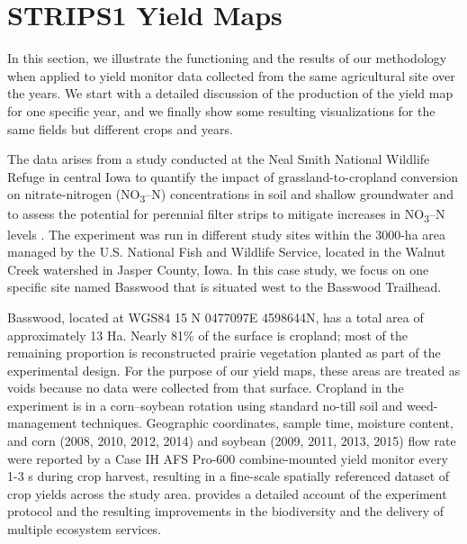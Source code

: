 \section{STRIPS1 Yield Maps}

 In this section, we illustrate the
functioning and the results of our methodology when applied to yield
monitor data collected from the same agricultural site over the
years. We start with a detailed discussion of the production of the
yield map for one specific year, and we finally show some resulting
visualizations for the same fields but different crops and years.

 The data arises from a study
conducted at the Neal Smith National Wildlife Refuge in central Iowa
to quantify the impact of grassland-to-cropland conversion on
nitrate-nitrogen (NO\textsubscript{3}–N) concentrations in soil and
shallow groundwater and to assess the potential for perennial filter
strips to mitigate increases in NO\textsubscript{3}–N levels
\citep{Zhou2010}. The experiment was run in different study sites
within the 3000-ha area managed by the U.S. National Fish and Wildlife
Service, located in the Walnut Creek watershed in Jasper County,
Iowa. In this case study, we focus on one specific site named Basswood
that is situated west to the Basswood Trailhead.

 Basswood, located at WGS84 15 N
0477097E 4598644N, has a total area of approximately 13 Ha. Nearly
81\% of the surface is cropland; most of the remaining proportion is
reconstructed prairie vegetation planted as part of the experimental
design. For the purpose of our yield maps, these areas are treated as
voids because no data were collected from that surface. Cropland in the
experiment is in a corn–soybean rotation using standard no-till soil
and weed-management techniques. Geographic coordinates, sample time,
moisture content, and corn (2008, 2010, 2012, 2014) and soybean (2009,
2011, 2013, 2015) flow rate were reported by a Case IH AFS Pro-600
combine-mounted yield monitor every 1-3 s during crop harvest,
resulting in a fine-scale spatially referenced dataset of crop yields
across the study area. \cite{Schulte2017} provides a detailed account
of the experiment protocol and the resulting improvements in the
biodiversity and the delivery of multiple ecosystem services.

